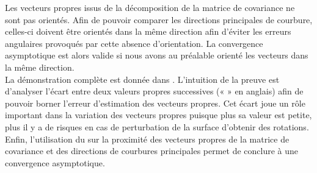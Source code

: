 %
Les vecteurs propres issus de la décomposition de la matrice de covariance ne
sont pas orientés. Afin de pouvoir comparer les directions principales de
courbure, celles-ci doivent être orientés dans la même direction afin d'éviter
les erreurs angulaires provoqués par cette absence d'orientation. La convergence
asymptotique est alors valide si nous avons au préalable orienté les vecteurs dans
la même direction.
%
\\
%
La démonstration complète est donnée dans \cite{ChapterIICurvature}. L'intuition
de la preuve est d'analyser l'écart entre deux valeurs propres successives («
 » en anglais) afin de pouvoir borner l'erreur d'estimation
des vecteurs propres. Cet écart joue un rôle important dans la variation des
vecteurs propres puisque plus sa valeur est petite, plus il y a de risques en
cas de perturbation de la surface d'obtenir des rotations. Enfin, l'utilisation
du  sur la proximité des vecteurs propres de la
matrice de covariance et des directions de courbures principales permet de
conclure à une convergence asymptotique.
%
